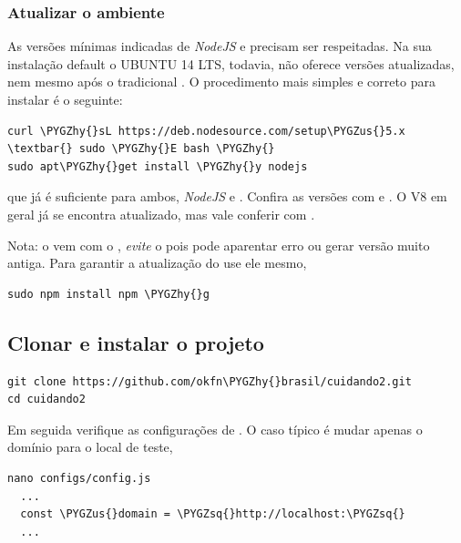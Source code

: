 \documentclass[letterpaper,10pt,brazil]{sphinxmanual}
\def\PYGZus{\char`\_}
\def\PYGZhy{\char`\-}
\def\PYGZsq{\char`\'}
\renewcommand\PYGZsq{\textquotesingle}
\begin{document}
\subsubsection{Atualizar o ambiente}
\label{install-site:atualizar-o-ambiente}
As versões mínimas indicadas de \emph{NodeJS} e  precisam ser
respeitadas. Na sua instalação default o UBUNTU 14 LTS, todavia, não
oferece versões atualizadas, nem mesmo após o tradicional
. O procedimento mais simples e correto para instalar
é o seguinte:

\begin{Verbatim}[commandchars=\\\{\}]
curl \PYGZhy{}sL https://deb.nodesource.com/setup\PYGZus{}5.x \textbar{} sudo \PYGZhy{}E bash \PYGZhy{}
sudo apt\PYGZhy{}get install \PYGZhy{}y nodejs
\end{Verbatim}

que já é suficiente para ambos, \emph{NodeJS} e . Confira as versões
com  e . O V8 em geral já se encontra
atualizado, mas vale conferir com .

Nota: o  vem com o , \emph{evite} o 
pois pode aparentar erro ou gerar versão muito antiga. Para garantir a
atualização do  use ele mesmo,

\begin{Verbatim}[commandchars=\\\{\}]
sudo npm install npm \PYGZhy{}g
\end{Verbatim}


\subsection{Clonar e instalar o projeto}
\label{install-site:clonar-e-instalar-o-projeto}
\begin{Verbatim}[commandchars=\\\{\}]
git clone https://github.com/okfn\PYGZhy{}brasil/cuidando2.git
cd cuidando2
\end{Verbatim}

Em seguida verifique as configurações de . O caso
típico é mudar apenas o domínio para o local de teste,

\begin{Verbatim}[commandchars=\\\{\}]
nano configs/config.js
  ...
  const \PYGZus{}domain = \PYGZsq{}http://localhost:\PYGZsq{}
  ...
\end{Verbatim}
\end{document}
